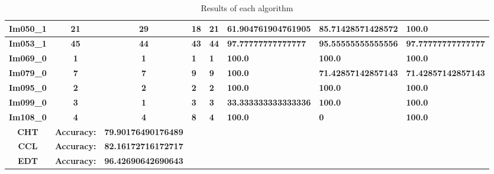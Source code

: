 \begin{table}[H]
\begin{tabular}{|c|c|c|}
 \textbf{Im050\_1} & \textbf{21} & \textbf{29} & \textbf{18} & \textbf{21} & \textbf{61.904761904761905} & \textbf{85.71428571428572} & \textbf{100.0} \\ \hline
 \textbf{Im053\_1} & \textbf{45} & \textbf{44} & \textbf{43} & \textbf{44} & \textbf{97.77777777777777} & \textbf{95.55555555555556} & \textbf{97.77777777777777} \\ \hline
 \textbf{Im069\_0} & \textbf{1} & \textbf{1} & \textbf{1} & \textbf{1} & \textbf{100.0} & \textbf{100.0} & \textbf{100.0} \\ \hline
 \textbf{Im079\_0} & \textbf{7} & \textbf{7} & \textbf{9} & \textbf{9} & \textbf{100.0} & \textbf{71.42857142857143} & \textbf{71.42857142857143} \\ \hline
 \textbf{Im095\_0} & \textbf{2} & \textbf{2} & \textbf{2} & \textbf{2} & \textbf{100.0} & \textbf{100.0} & \textbf{100.0} \\ \hline
 \textbf{Im099\_0} & \textbf{3} & \textbf{1} & \textbf{3} & \textbf{3} & \textbf{33.333333333333336} & \textbf{100.0} & \textbf{100.0} \\ \hline
 \textbf{Im108\_0} & \textbf{4} & \textbf{4} & \textbf{8} & \textbf{4} & \textbf{100.0} & \textbf{0} & \textbf{100.0} \\ \hline
 \textbf{CHT} & \textbf{Accuracy:} & \textbf{79.90176490176489} \\ \hline
 \textbf{CCL} & \textbf{Accuracy:} & \textbf{82.16172716172717} \\ \hline
 \textbf{EDT} & \textbf{Accuracy:} & \textbf{96.42690642690643} \\ \hline

\end{tabular}
\caption{Results of each algorithm}
\label{Results of each algorithm}
\end{table}

